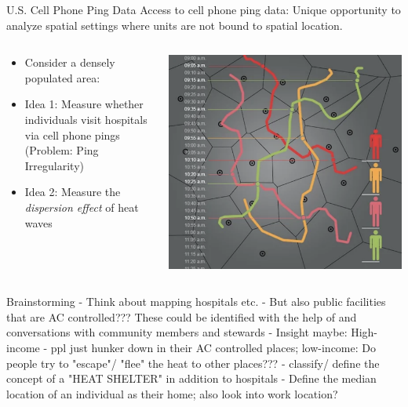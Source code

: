 \begin{frame}{U.S. Cell Phone Ping Data}
Access to cell phone ping data: Unique opportunity to analyze spatial settings where units are not bound to spatial location.
\vspace{5pt}
\begin{columns}
    \begin{column}{0.65\linewidth}
    \begin{itemize}
    \item Consider a densely populated area:
    \vspace{-7pt}
    \item Idea 1: Measure whether individuals visit hospitals via cell phone pings (Problem: Ping Irregularity)
    \vspace{-7pt}
    \item Idea 2: Measure the \textit{dispersion effect} of heat waves
    \end{itemize}
    \end{column}
     \begin{column}{0.4\linewidth}
      \includegraphics[scale=0.16]{figures/cell_ping.png}
      \caption{}
    \end{column}
\end{columns}
\end{frame}

\begin{frame}{Brainstorming}
- Think about mapping hospitals etc. 
- But also public facilities that are AC controlled??? These could be identified with the help of and conversations with community members and stewards
- Insight maybe: High-income - ppl just hunker down in their AC controlled places; low-income: Do people try to "escape"/ "flee" the heat to other places???
- classify/ define the concept of a "HEAT SHELTER" in addition to hospitals
- Define the median location of an individual as their home; also look into work location?
\end{frame}